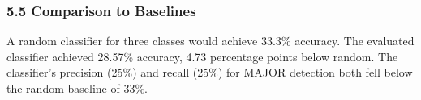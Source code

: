 \subsubsection{5.5 Comparison to Baselines}

A random classifier for three classes would achieve 33.3\% accuracy. The evaluated classifier achieved 28.57\% accuracy, 4.73 percentage points below random. The classifier's precision (25\%) and recall (25\%) for MAJOR detection both fell below the random baseline of 33\%.
